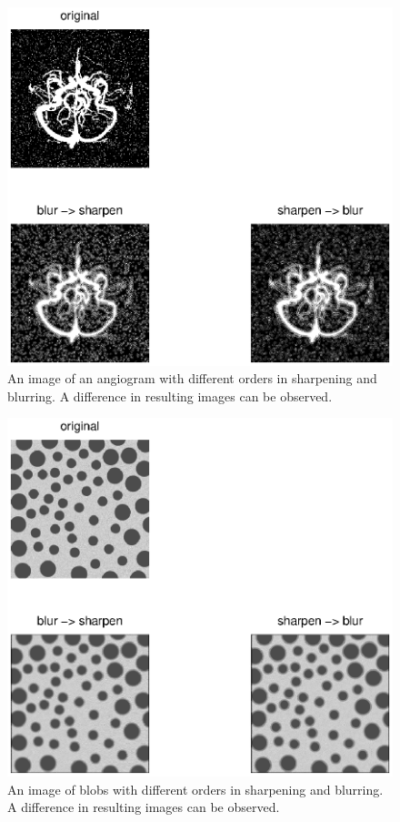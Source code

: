 \begin{figure}[!Htb]
 \centering
 \includegraphics{angios.eps}
 \caption{An image of an angiogram with different orders in sharpening and blurring. A difference in resulting images can be observed. }
 \label{fig:angios}
\end{figure}
\begin{figure}[!Htb]
 \centering
 \includegraphics{blobs.eps}
 \caption{An image of blobs with different orders in sharpening and blurring. A difference in resulting images can be observed.}
 \label{fig:blobs}
\end{figure}

